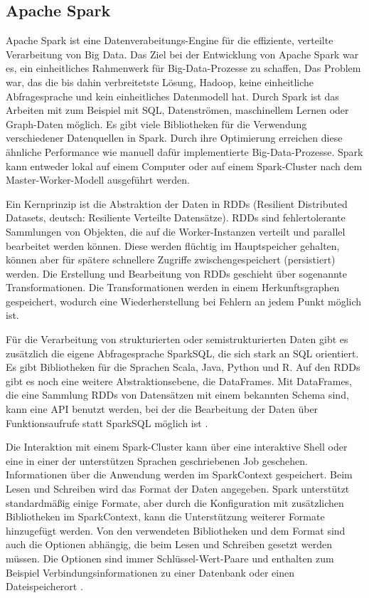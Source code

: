 \subsection{Apache Spark}
\label{sec:spark}

Apache Spark ist eine Datenverabeitungs-Engine für die effiziente, verteilte Verarbeitung von Big Data.
Das Ziel bei der Entwicklung von Apache Spark war es, ein einheitliches Rahmenwerk für Big-Data-Prozesse zu schaffen,
Das Problem war, das die bis dahin verbreitetste Lösung, Hadoop, keine einheitliche Abfragesprache und kein einheitliches Datenmodell hat.
Durch Spark ist das Arbeiten mit zum Beispiel mit SQL, Datenströmen, maschinellem Lernen oder Graph-Daten möglich.
Es gibt viele Bibliotheken für die Verwendung verschiedener Datenquellen in Spark.
Durch ihre Optimierung erreichen diese ähnliche Performance wie manuell dafür implementierte Big-Data-Prozesse.
Spark kann entweder lokal auf einem Computer oder auf einem Spark-Cluster nach dem Master-Worker-Modell ausgeführt werden.

Ein Kernprinzip ist die Abstraktion der Daten in RDDs (Resilient Distributed Datasets, deutsch: Resiliente Verteilte Datensätze).
RDDs sind fehlertolerante Sammlungen von Objekten, die auf die Worker-Instanzen verteilt und parallel bearbeitet werden können.
Diese werden flüchtig im Hauptspeicher gehalten, können aber für spätere schnellere Zugriffe zwischengespeichert (persistiert) werden.
Die Erstellung und Bearbeitung von RDDs geschieht über sogenannte Transformationen.
Die Transformationen werden in einem Herkunftsgraphen gespeichert, wodurch eine Wiederherstellung bei Fehlern an jedem Punkt möglich ist.

Für die Verarbeitung von strukturierten oder semistrukturierten Daten gibt es zusätzlich die eigene Abfragesprache SparkSQL, die sich stark an SQL orientiert.
Es gibt Bibliotheken für die Sprachen Scala, Java, Python und R.
Auf den RDDs gibt es noch eine weitere Abstraktionsebene, die DataFrames.
Mit DataFrames, die eine Sammlung RDDs von Datensätzen mit einem bekannten Schema sind, kann eine API benutzt werden, bei der die Bearbeitung der Daten über Funktionsaufrufe statt SparkSQL möglich ist \parencite{spark}.

Die Interaktion mit einem Spark-Cluster kann über eine interaktive Shell oder eine in einer der unterstützen Sprachen geschriebenen Job geschehen.
Informationen über die Anwendung werden im SparkContext gespeichert.
Beim Lesen und Schreiben wird das Format der Daten angegeben.
Spark unterstützt standardmäßig einige Formate, aber durch die Konfiguration mit zusätzlichen Bibliotheken im SparkContext, kann die Unterstützung weiterer Formate hinzugefügt werden.
Von den verwendeten Bibliotheken und dem Format sind auch die Optionen abhängig, die beim Lesen und Schreiben gesetzt werden müssen.
Die Optionen sind immer Schlüssel-Wert-Paare und enthalten zum Beispiel Verbindungsinformationen zu einer Datenbank oder einen Dateispeicherort \parencite{spark-website}.

